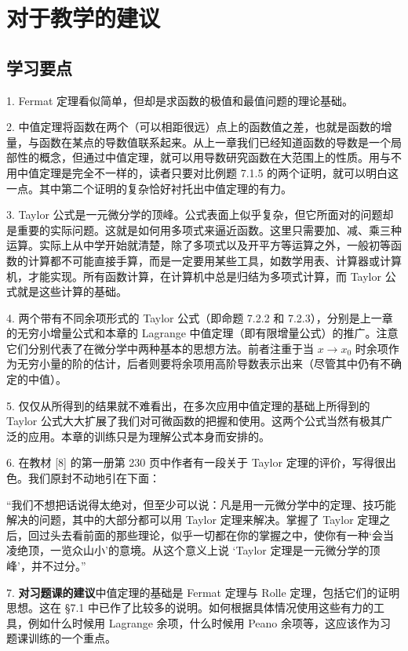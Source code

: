 \section{对于教学的建议}

\subsection{学习要点}

1. Fermat 定理看似简单，但却是求函数的极值和最值问题的理论基础。

2. 中值定理将函数在两个（可以相距很远）点上的函数值之差，也就是函数的增量，与函数在某点的导数值联系起来。从上一章我们已经知道函数的导数是一个局部性的概念，但通过中值定理，就可以用导数研究函数在大范围上的性质。用与不用中值定理是完全不一样的，读者只要对比例题 7.1.5 的两个证明，就可以明白这一点。其中第二个证明的复杂恰好衬托出中值定理的有力。

3. Taylor 公式是一元微分学的顶峰。公式表面上似乎复杂，但它所面对的问题却是重要的实际问题。这就是如何用多项式来逼近函数。这里只需要加、减、乘三种运算。实际上从中学开始就清楚，除了多项式以及开平方等运算之外，一般初等函数的计算都不可能直接手算，而是一定要用某些工具，如数学用表、计算器或计算机，才能实现。所有函数计算，在计算机中总是归结为多项式计算，而 Taylor 公式就是这些计算的基础。

4. 两个带有不同余项形式的 Taylor 公式（即命题 7.2.2 和 7.2.3），分别是上一章的无穷小增量公式和本章的 Lagrange 中值定理（即有限增量公式）的推广。注意它们分别代表了在微分学中两种基本的思想方法。前者注重于当 $x\to x_0$ 时余项作为无穷小量的阶的估计，后者则要将余项用高阶导数表示出来（尽管其中仍有不确定的中值）。

5. 仅仅从所得到的结果就不难看出，在多次应用中值定理的基础上所得到的 Taylor 公式大大扩展了我们对可微函数的把握和使用。这两个公式当然有极其广泛的应用。本章的训练只是为理解公式本身而安排的。

6. 在教材 [8] 的第一册第 230 页中作者有一段关于 Taylor 定理的评价，写得很出色。我们原封不动地引在下面：

“我们不想把话说得太绝对，但至少可以说：凡是用一元微分学中的定理、技巧能解决的问题，其中的大部分都可以用 Taylor 定理来解决。掌握了 Taylor 定理之后，回过头去看前面的那些理论，似乎一切都在你的掌握之中，使你有一种‘会当凌绝顶，一览众山小’的意境。从这个意义上说 ‘Taylor 定理是一元微分学的顶峰’，并不过分。”

7. \textbf{对习题课的建议}\quad 中值定理的基础是 Fermat 定理与 Rolle 定理，包括它们的证明思想。这在 §7.1 中已作了比较多的说明。如何根据具体情况使用这些有力的工具，例如什么时候用 Lagrange 余项，什么时候用 Peano 余项等，这应该作为习题课训练的一个重点。

